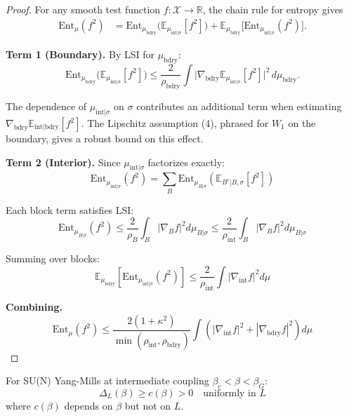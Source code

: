 \begin{proof}
For any smooth test function $f: \mathcal{X} \to \mathbb{R}$, the chain rule for entropy gives
\begin{align*}
\mathrm{Ent}_\mu(f^2)
&= \mathrm{Ent}_{\mu_{\mathrm{bdry}}}\!\Big(\mathbb{E}_{\mu_{\mathrm{int}|\sigma}}[f^2]\Big)
 + \mathbb{E}_{\mu_{\mathrm{bdry}}}\!\Big[\mathrm{Ent}_{\mu_{\mathrm{int}|\sigma}}(f^2)\Big].
\end{align*}

\textbf{Term 1 (Boundary).} By LSI for $\mu_{\mathrm{bdry}}$:
\[
\mathrm{Ent}_{\mu_{\mathrm{bdry}}}\!\Big(\mathbb{E}_{\mu_{\mathrm{int}|\sigma}}[f^2]\Big)
\leq \frac{2}{\rho_{\mathrm{bdry}}} \int \big|\nabla_{\mathrm{bdry}} \mathbb{E}_{\mu_{\mathrm{int}|\sigma}}[f^2]\big|^2 \, d\mu_{\mathrm{bdry}}.
\]

The dependence of $\mu_{\mathrm{int}|\sigma}$ on $\sigma$ contributes an additional term when
estimating $\nabla_{\mathrm{bdry}} \mathbb{E}_{\mathrm{int}|\mathrm{bdry}}[f^2]$. The Lipschitz
assumption (4), phrased for $W_1$ on the boundary, gives a robust bound on this effect.

\textbf{Term 2 (Interior).} Since $\mu_{\mathrm{int}|\sigma}$ factorizes exactly:
\[
\mathrm{Ent}_{\mu_{\mathrm{int}|\sigma}}(f^2) = \sum_B \mathrm{Ent}_{\mu_{B|\sigma}}(\mathbb{E}_{B^c|B,\sigma}[f^2])
\]

Each block term satisfies LSI:
\[
\mathrm{Ent}_{\mu_{B|\sigma}}(f^2) \leq \frac{2}{\rho_B} \int_B |\nabla_B f|^2 d\mu_{B|\sigma}
\leq \frac{2}{\rho_{\mathrm{int}}} \int_B |\nabla_B f|^2 d\mu_{B|\sigma}
\]

Summing over blocks:
\[
\mathbb{E}_{\mu_{\mathrm{bdry}}}[\mathrm{Ent}_{\mu_{\mathrm{int}|\sigma}}(f^2)] 
\leq \frac{2}{\rho_{\mathrm{int}}} \int |\nabla_{\mathrm{int}} f|^2 d\mu
\]

\textbf{Combining.}
\[
\mathrm{Ent}_\mu(f^2) \leq \frac{2(1+\kappa^2)}{\min(\rho_{\mathrm{int}}, \rho_{\mathrm{bdry}})} \int (|\nabla_{\mathrm{int}} f|^2 + |\nabla_{\mathrm{bdry}} f|^2) d\mu
\]
\end{proof}

\begin{corollary}
\label{cor:ym-uniform-gap}
For SU(N) Yang-Mills at intermediate coupling $\beta_c < \beta < \beta_G$:
\[
\Delta_L(\beta) \geq c(\beta) > 0 \quad \text{uniformly in } L
\]
where $c(\beta)$ depends on $\beta$ but not on $L$.
\end{corollary}

